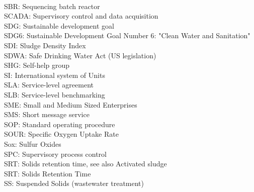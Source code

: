 \vspace{0.3cm}\\
SBR:  Sequencing batch reactor
\vspace{0.3cm}\\
SCADA:  Supervisory control and data acquisition
\vspace{0.3cm}\\
SDG:  Sustainable development goal
\vspace{0.3cm}\\
SDG6:  Sustainable Development Goal Number 6: "Clean Water and Sanitation"
\vspace{0.3cm}\\
SDI:  Sludge Density Index
\vspace{0.3cm}\\
SDWA:  Safe Drinking Water Act (US legislation)
\vspace{0.3cm}\\
SHG:  Self-help group
\vspace{0.3cm}\\
SI:  International system of Units
\vspace{0.3cm}\\
SLA:  Service-level agreement
\vspace{0.3cm}\\
SLB:  Service-level benchmarking
\vspace{0.3cm}\\
SME:  Small and Medium Sized Enterprises
\vspace{0.3cm}\\
SMS:  Short message service
\vspace{0.3cm}\\
SOP:  Standard operating procedure
\vspace{0.3cm}\\
SOUR:  Specific Oxygen Uptake Rate
\vspace{0.3cm}\\
Sox:  Sulfur Oxides
\vspace{0.3cm}\\
SPC:  Supervisory process control
\vspace{0.3cm}\\
SRT:  Solids retention time, see also Activated sludge
\vspace{0.3cm}\\
SRT:  Solids Retention Time
\vspace{0.3cm}\\
SS:  Suspended Solids (wastewater treatment)
\vspace{0.3cm}\\

